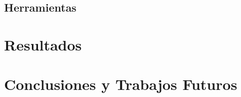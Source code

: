 \documentclass[a4paper,12pt,spanish]{book}
\begin{document}
\section{Herramientas}



\chapter{Resultados}


\chapter{Conclusiones y Trabajos Futuros}

\newpage
\footnotesize
% 
% 
\printbibliography

\newpage
\newpage
\vfill
\addtocounter{page}{-1}
\clearpage
\thispagestyle{empty}
\phantom{a}
\vfill
\newpage
\vfill
\addtocounter{page}{-1}
\end{document}
